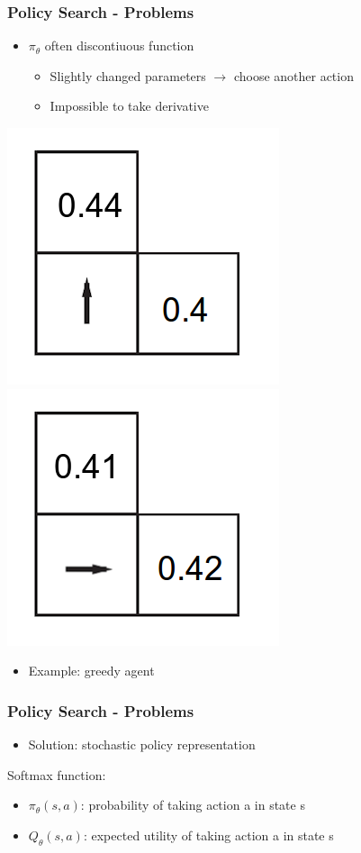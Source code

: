 \begin{frame}
    \frametitle{Policy Search - Problems}
    \begin{itemize}
    	\item  $\pi_{\theta}$ often discontiuous function
    	\begin{itemize}
    		\item Slightly changed parameters $\rightarrow$ choose another action
    		\item Impossible to take derivative
    	\end{itemize}
    \end{itemize}
    
	\begin{center}
		\includegraphics[width=0.3\linewidth]{img-michael/policy_search_first_choice.png}
		\includegraphics[width=0.3\linewidth]{img-michael/policy_search_second_choice.png}
	\end{center}
	
    \begin{itemize}
    	\item Example: greedy agent
	\end{itemize}
\end{frame}

\begin{frame}
	\frametitle{Policy Search - Problems}
	\begin{itemize}
    	\item Solution: stochastic policy representation
    \end{itemize}
    
    Softmax function:
    
	
	\begin{itemize}
    	\item $\pi_{\theta}(s,a)$: probability of taking action a in state s
    	\item $Q_{\theta}(s,a)$: expected utility of taking action a in state s
    \end{itemize}
\end{frame}


